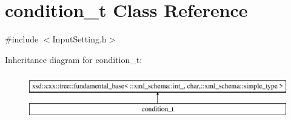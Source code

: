 \hypertarget{classcondition__t}{\section{condition\-\_\-t Class Reference}
\label{classcondition__t}
}


{\ttfamily \#include $<$Input\-Setting.\-h$>$}

Inheritance diagram for condition\-\_\-t\-:\begin{figure}[H]
\begin{center}
\leavevmode
\includegraphics[height=2.000000cm]{classcondition__t}
\end{center}
\end{figure}
